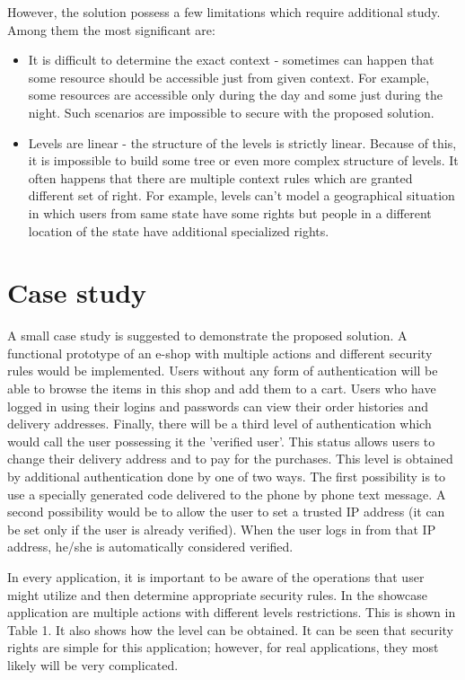 \documentclass{sig-alternate-05-2015}
\begin{document}
However, the solution possess a few limitations which require additional study. Among them the most significant are:
\begin{itemize}
		\setlength{\itemsep}{1pt}
	 \setlength{\parskip}{0pt}
  \setlength{\parsep}{0pt}

  \item It is difficult to determine the exact context - sometimes can happen that some resource should be accessible just from given context. For example, some resources are accessible only during the day and some just during the night. Such scenarios are impossible to secure with the proposed solution.
  
  \item Levels are linear - the structure of the levels is strictly linear.  Because of this, it is impossible to build some tree or even more complex structure of levels. It often happens that there are multiple context rules which are granted different set of right. For example, levels can't model a geographical situation in which users from same state have some rights but people in a different location of the state have additional specialized rights.
\end{itemize}

\section{Case study}
A small case study is suggested to demonstrate the proposed solution.  A functional prototype of an e-shop with multiple actions and different security rules would be implemented. Users without any form of authentication will be able to browse the items in this shop and add them to a cart. Users who have logged in using their logins and passwords can view their order histories and delivery addresses. Finally, there will be a third level of authentication which would call the user possessing it the 'verified user'. This status allows users to change their delivery address and to pay for the purchases. This level is obtained by additional authentication done by one of two ways. The first possibility is to use a specially generated code delivered to the phone by phone text message. A second possibility would be to allow the user to set a trusted IP address (it can be set only if the user is already verified). When the user logs in from that IP address, he/she is automatically considered verified.

In every application, it is important to be aware of the operations that user might utilize and then determine appropriate security rules. In the showcase application are multiple actions with different levels restrictions. This is shown in Table 1. It also shows how the level can be obtained. It can be seen that security rights are simple for this application; however, for real applications, they most likely will be very complicated.
\end{document}
